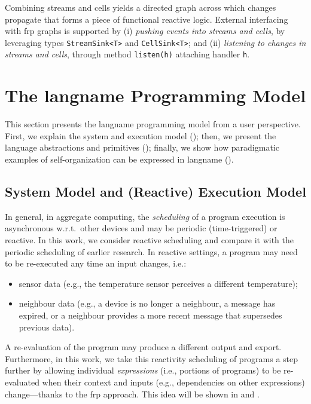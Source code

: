   
Combining streams and cells yields a directed graph across which changes propagate
that forms a piece of functional reactive logic.
%
External interfacing with \ac{frp} graphs
 is supported by
 (i) \emph{pushing events into streams and cells}, by leveraging types \texttt{StreamSink<T>} and \texttt{CellSink<T>};
 and
 (ii) \emph{listening to changes in streams and cells}, through method \texttt{listen(h)} attaching handler \texttt{h}.
 
\section{The \ac{langname} Programming Model}
\label{acsos2023-frp:sec:contrib}

%

This section presents the \ac{langname} programming model from a user perspective.
%
First, we explain the system and execution model ();
 then, we present the language abstractions and primitives ();
 finally, we show how paradigmatic examples of self-organization can be expressed in \ac{langname} ().

\subsection{System Model and (Reactive) Execution Model}
\label{acsos2023-frp:sec:sys-model}
In general, in aggregate computing, the \emph{scheduling} of a program execution 
is asynchronous w.r.t.\ other devices
  and may be periodic (time-triggered)
  or reactive.
%
In this work, we consider reactive scheduling
and compare it with the periodic scheduling of earlier research.
%
In reactive settings, 
 a program may need to be re-executed any time an input changes, i.e.:
%
\begin{itemize}
\item sensor data (e.g., the temperature sensor perceives a different temperature);
\item neighbour data
    (e.g., a device is no longer a neighbour,
    a message has expired,
    or a neighbour provides a more recent message that supersedes previous data).
\end{itemize}
%
A re-evaluation of the program
 may produce a different output and export.  
%
Furthermore, 
 in this work, we take this reactivity scheduling of programs a step further
 by allowing individual \emph{expressions} (i.e., portions of programs)
 to be re-evaluated when their context and inputs (e.g., dependencies on other expressions) change---thanks to the \ac{frp} approach.
%
This idea will be shown in  and .

